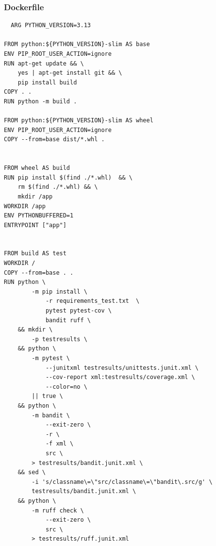 \subsubsection*{Dockerfile}
\begin{lstlisting}
  ARG PYTHON_VERSION=3.13

FROM python:${PYTHON_VERSION}-slim AS base
ENV PIP_ROOT_USER_ACTION=ignore
RUN apt-get update && \
    yes | apt-get install git && \
    pip install build
COPY . .
RUN python -m build .

FROM python:${PYTHON_VERSION}-slim AS wheel
ENV PIP_ROOT_USER_ACTION=ignore
COPY --from=base dist/*.whl .


FROM wheel AS build
RUN pip install $(find ./*.whl)  && \
    rm $(find ./*.whl) && \
    mkdir /app
WORKDIR /app
ENV PYTHONBUFFERED=1
ENTRYPOINT ["app"]


FROM build AS test
WORKDIR /
COPY --from=base . .
RUN python \
        -m pip install \
            -r requirements_test.txt  \
            pytest pytest-cov \
            bandit ruff \
    && mkdir \
        -p testresults \
    && python \
        -m pytest \
            --junitxml testresults/unittests.junit.xml \
            --cov-report xml:testresults/coverage.xml \
            --color=no \
        || true \
    && python \
        -m bandit \
            --exit-zero \
            -r \
            -f xml \
            src \
        > testresults/bandit.junit.xml \
    && sed \
        -i 's/classname\=\"src/classname\=\"bandit\.src/g' \
        testresults/bandit.junit.xml \
    && python \
        -m ruff check \
            --exit-zero \
            src \
        > testresults/ruff.junit.xml

\end{lstlisting}

